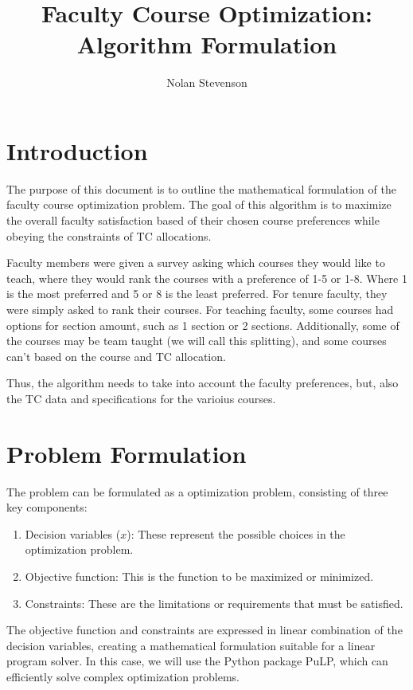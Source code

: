 \documentclass{article}
\title{Faculty Course Optimization:\\
Algorithm Formulation}
\author{Nolan Stevenson}
\date{} %
\begin{document}
\maketitle

\newpage
\section{Introduction}

	The purpose of this document is to outline the mathematical formulation of the faculty course optimization problem.
    The goal of this algorithm is to maximize the overall faculty satisfaction based of their chosen course preferences while obeying the constraints of TC allocations.

    Faculty members were given a survey asking which courses they would like to teach, where they would rank the courses with a preference of 1-5 or 1-8. Where 1 is the most preferred and 5 or 8 is the least preferred.
    For tenure faculty, they were simply asked to rank their courses. For teaching faculty, some courses had options for section amount, such as 1 section or 2 sections.
    Additionally, some of the courses may be team taught (we will call this splitting), and some courses can't based on the course and TC allocation.

    Thus, the algorithm needs to take into account the faculty preferences, but, also the TC data and specifications for the varioius courses.
    

\section{Problem Formulation}

    The problem can be formulated as a optimization problem, consisting of three key components:
    
    \begin{enumerate}
        \item Decision variables ($x$): These represent the possible choices in the optimization problem.
        \item Objective function: This is the function to be maximized or minimized.
        \item Constraints: These are the limitations or requirements that must be satisfied.
    \end{enumerate}
    
    The objective function and constraints are expressed in linear combination of the decision variables, creating a mathematical formulation suitable for a linear program solver. In this case, we will use the Python package PuLP, which can efficiently solve complex optimization problems.
    
\end{document}
